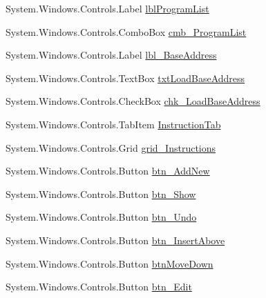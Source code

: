 \begin{DoxyCompactItemize}
\item 
System.\+Windows.\+Controls.\+Label \hyperlink{class_c_p_u___o_s___simulator_1_1_main_window_a9cbfc378965cf635e61c760e11dd5c8a}{lbl\+Program\+List}
\item 
System.\+Windows.\+Controls.\+Combo\+Box \hyperlink{class_c_p_u___o_s___simulator_1_1_main_window_a9871f5933923725d4386a7a7f3f8828f}{cmb\+\_\+\+Program\+List}
\item 
System.\+Windows.\+Controls.\+Label \hyperlink{class_c_p_u___o_s___simulator_1_1_main_window_ae3adff2ef98d792ce094dcc229c293a8}{lbl\+\_\+\+Base\+Address}
\item 
System.\+Windows.\+Controls.\+Text\+Box \hyperlink{class_c_p_u___o_s___simulator_1_1_main_window_ae6c0ce6078d081b2cb99518c68f1cd85}{txt\+Load\+Base\+Address}
\item 
System.\+Windows.\+Controls.\+Check\+Box \hyperlink{class_c_p_u___o_s___simulator_1_1_main_window_a8ade8cf3e5e2ec2374c984dac406b5e9}{chk\+\_\+\+Load\+Base\+Address}
\item 
System.\+Windows.\+Controls.\+Tab\+Item \hyperlink{class_c_p_u___o_s___simulator_1_1_main_window_a4fe9f6d97eb1f2c45b9e5a0363e61557}{Instruction\+Tab}
\item 
System.\+Windows.\+Controls.\+Grid \hyperlink{class_c_p_u___o_s___simulator_1_1_main_window_af09ff1f305e936227c4a975f4c788133}{grid\+\_\+\+Instructions}
\item 
System.\+Windows.\+Controls.\+Button \hyperlink{class_c_p_u___o_s___simulator_1_1_main_window_a50fb8fcd9e592c4987fac4bcb8762785}{btn\+\_\+\+Add\+New}
\item 
System.\+Windows.\+Controls.\+Button \hyperlink{class_c_p_u___o_s___simulator_1_1_main_window_a3c6c4760a8fd64f653fff0ad06374f13}{btn\+\_\+\+Show}
\item 
System.\+Windows.\+Controls.\+Button \hyperlink{class_c_p_u___o_s___simulator_1_1_main_window_ac30720a1b345a3d59312d2d68f742359}{btn\+\_\+\+Undo}
\item 
System.\+Windows.\+Controls.\+Button \hyperlink{class_c_p_u___o_s___simulator_1_1_main_window_a23c681375b103d2294ac79c51f1fb406}{btn\+\_\+\+Insert\+Above}
\item 
System.\+Windows.\+Controls.\+Button \hyperlink{class_c_p_u___o_s___simulator_1_1_main_window_ac6bfabebf21c92a905764305b789df46}{btn\+Move\+Down}
\item 
System.\+Windows.\+Controls.\+Button \hyperlink{class_c_p_u___o_s___simulator_1_1_main_window_ae07013ea273fb1e9f38fd1dd83144371}{btn\+\_\+\+Edit}
\item 

\end{DoxyCompactItemize}
